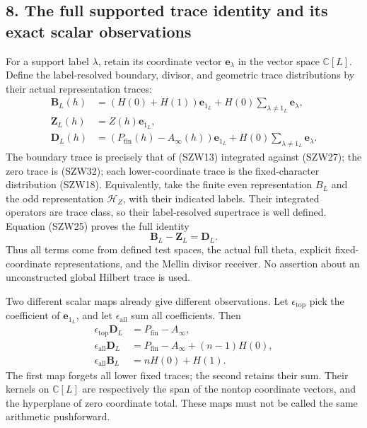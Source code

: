 \documentclass[
  10pt,
  a4paper,
]{article}
\begin{document}
\subsection{8. The full supported trace identity and its exact scalar
observations}\label{the-full-supported-trace-identity-and-its-exact-scalar-observations}

For a support label \(\lambda\), retain its coordinate vector
\(\mathbf e_\lambda\) in the vector space \(\mathbb C[L]\). Define the
label-resolved boundary, divisor, and geometric trace distributions by
their actual representation traces: \[
\begin{aligned}
\boldsymbol B_L(h)&=(H(0)+H(1))\mathbf e_{1_L}
+H(0)\sum_{\lambda\ne1_L}\mathbf e_\lambda,\\
\boldsymbol Z_L(h)&=Z(h)\mathbf e_{1_L},\\
\boldsymbol D_L(h)&=(P_{\mathrm{fin}}(h)-A_\infty(h))\mathbf e_{1_L}
+H(0)\sum_{\lambda\ne1_L}\mathbf e_\lambda.
\end{aligned}
\tag{SZW33}
\] The boundary trace is precisely that of (SZW13) integrated against
(SZW27); the zero trace is (SZW32); each lower-coordinate trace is the
fixed-character distribution (SZW18). Equivalently, take the finite even
representation \(B_L\) and the odd representation \(\mathcal H_Z\), with
their indicated labels. Their integrated operators are trace class, so
their label-resolved supertrace is well defined. Equation (SZW25) proves
the full identity \[
\boxed{\boldsymbol B_L-\boldsymbol Z_L=\boldsymbol D_L.}
\tag{SZW34}
\] Thus all terms come from defined test spaces, the actual full theta,
explicit fixed-coordinate representations, and the Mellin divisor
receiver. No assertion about an unconstructed global Hilbert trace is
used.

Two different scalar maps already give different observations. Let
\(\epsilon_{\mathrm{top}}\) pick the coefficient of \(\mathbf e_{1_L}\),
and let \(\epsilon_{\mathrm{all}}\) sum all coefficients. Then \[
\begin{aligned}
\epsilon_{\mathrm{top}}\boldsymbol D_L&=P_{\mathrm{fin}}-A_\infty,\\
\epsilon_{\mathrm{all}}\boldsymbol D_L&=P_{\mathrm{fin}}-A_\infty+(n-1)H(0),\\
\epsilon_{\mathrm{all}}\boldsymbol B_L&=nH(0)+H(1).
\end{aligned}
\tag{SZW35}
\] The first map forgets all lower fixed traces; the second retains
their sum. Their kernels on \(\mathbb C[L]\) are respectively the span
of the nontop coordinate vectors, and the hyperplane of zero coordinate
total. These maps must not be called the same arithmetic pushforward.
\end{document}
